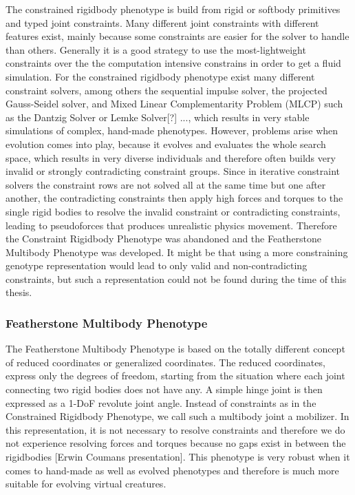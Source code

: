 \documentclass[main]{subfiles}
\begin{document}
The constrained rigidbody phenotype is build from rigid or softbody primitives and typed joint constraints. Many different joint constraints with different features exist, mainly because some constraints are easier for the solver to handle than others. Generally it is a good strategy to use the most-lightweight constraints over the the computation intensive constrains in order to get a fluid simulation. For the constrained rigidbody phenotype exist many different constraint solvers, among others the sequential impulse solver, the projected Gauss-Seidel solver, and Mixed Linear
Complementarity Problem (MLCP) such as the Dantzig Solver or Lemke Solver[?] ..., which results in very stable simulations of complex, hand-made phenotypes. However, problems arise when evolution comes into play, because it evolves and evaluates the whole search space, which results in very diverse individuals and therefore often builds very invalid or strongly contradicting constraint groups. Since in iterative constraint solvers the constraint rows are not solved all at the same time but one after another, the contradicting constraints then apply high forces and torques to the single rigid bodies to resolve the invalid constraint or contradicting constraints, leading to pseudoforces that produces unrealistic physics movement. Therefore the Constraint Rigidbody Phenotype was abandoned and the Featherstone Multibody Phenotype was developed. It might be that using a more constraining genotype representation would lead to only valid and non-contradicting constraints, but such a representation could not be found during the time of this thesis.


\subsubsection{Featherstone Multibody Phenotype}

The Featherstone Multibody Phenotype is based on the totally different concept of reduced coordinates or generalized coordinates. The reduced coordinates, express only the degrees of freedom, starting from the situation where each joint connecting two rigid bodies does not have any. A simple hinge joint is then expressed as a 1-DoF revolute joint angle. Instead of constraints as in the Constrained Rigidbody Phenotype, we call such a multibody joint a mobilizer. In this representation, it is not necessary to resolve constraints and therefore we do not experience resolving forces and torques because no gaps exist in between the rigidbodies [Erwin Coumans presentation]. This phenotype is very robust when it comes to hand-made as well as evolved phenotypes and therefore is much more suitable for evolving virtual creatures.
\end{document}
